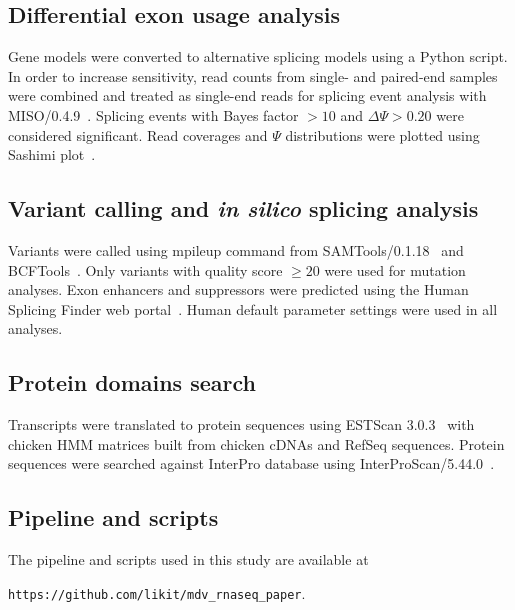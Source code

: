 \subsection{Differential exon usage analysis}

Gene models were converted to alternative splicing models using a
Python script.  In order to increase sensitivity, read counts
from single- and paired-end samples were combined and treated as
single-end reads for splicing event analysis with
MISO/0.4.9~\cite{Katz:2010iv}.  Splicing events with Bayes factor
$>10$ and $\Delta\Psi>0.20$ were considered significant.  Read
coverages and $\Psi$ distributions were plotted using Sashimi
plot~\cite{Katz:2013vx}.

\subsection{Variant calling and {\em in silico} splicing
analysis}

Variants were called using mpileup command from
SAMTools/0.1.18~\cite{li2009sequence} and
BCFTools~\cite{bcftools}.  Only variants with quality score
$\ge20$ were used for mutation analyses.  Exon enhancers and
suppressors were predicted using the Human Splicing Finder web
portal~\cite{desmet2009human}.  Human default parameter settings
were used in all analyses. 

\subsection{Protein domains search}

Transcripts were translated to protein sequences using ESTScan
3.0.3~\cite{iseli1999estscan} with chicken HMM matrices built
from chicken cDNAs and RefSeq sequences. Protein sequences were
searched against InterPro database using
InterProScan/5.44.0~\cite{quevillon2005interproscan}.

\subsection{Pipeline and scripts}
The pipeline and scripts used in this study are available at

\texttt{https://github.com/likit/mdv\_rnaseq\_paper}.
